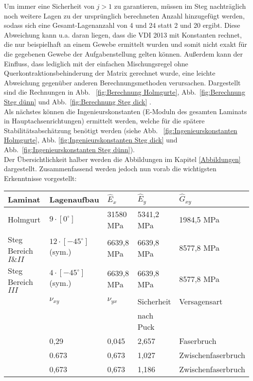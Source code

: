 \noindent Um immer eine Sicherheit von $j>1$ zu garantieren, müssen im Steg nachträglich noch weitere Lagen zu der ursprünglich berechneten Anzahl hinzugefügt werden, sodass sich eine Gesamt-Lagenanzahl von 4 und 24 statt 2 und 20 ergibt. Diese Abweichung kann u.a. daran liegen, dass die VDI 2013 mit Konstanten rechnet, die nur beispielhaft an einem Gewebe ermittelt wurden und somit nicht exakt für die gegebenen Gewebe der Aufgabenstellung gelten können. Außerdem kann der Einfluss, dass lediglich mit der einfachen Mischungsregel ohne Querkontraktionsbehinderung der Matrix gerechnet wurde, eine leichte Abweichung gegenüber anderen Berechnungsmethoden verursachen.
Dargestellt sind die Rechnungen in Abb. ~\ref{fig:Berechnung Holmgurte}, Abb.~\ref{fig:Berechnung Steg dünn} und Abb.~\ref{fig:Berechnung Steg dick} \cite{item3}\cite{item5}.\\

\noindent Als nächstes können die Ingenieurskonstanten (E-Moduln des gesamten Laminats in Hauptachsenrichtungen) ermittelt werden, welche für die spätere Stabilitätsabschätzung benötigt werden (siehe Abb. ~\ref{fig:Ingenieurskonstanten Holmgurte}, Abb. \ref{fig:Ingenieurskonstanten Steg dick} und Abb.~\ref{fig:Ingenieurskonstanten Steg dünn}).\\

\noindent Der Übersichtlichkeit halber werden die Abbildungen im Kapitel \ref{Abbildungen} dargestellt. Zusammenfassend werden jedoch nun vorab die wichtigsten Erkenntnisse vorgestellt:

\begin{longtable}{lllll}

Laminat&Lagenaufbau&$\hat{E}_{x}$&$\hat{E}_{y}$&$\hat{G}_{xy}$\\
\hline\hline
Holmgurt&$9\cdot[0^{\circ}]$&31580 MPa&5341,2 MPa&1984,5 MPa\\
Steg Bereich $I\&II$&$12\cdot[-45^{\circ}]$(sym.)&6639,8 MPa&6639,8 MPa&8577,8 MPa\\
Steg Bereich $III$&$4\cdot[-45^{\circ}]$(sym.)&6639,8 MPa&6639,8 MPa&8577,8 MPa\\
\hline
&$\nu_{xy}$&$\nu_{yx}$&Sicherheit&Versagensart\\
&&&nach Puck&\\
\hhline{~====}
&0,29&0,045&2,657&Faserbruch\\
&0.673&0,673&1,027&Zwischenfaserbruch\\
&0,673&0,673&1,186&Zwischenfaserbruch\\
\end{longtable}
